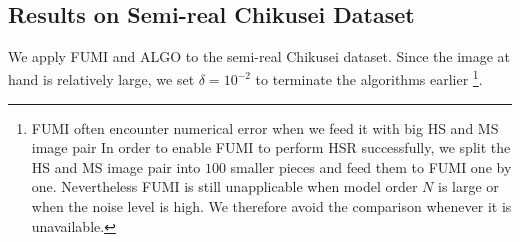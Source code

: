 \newpage
$\;$
\newpage
\subsection{Results on Semi-real Chikusei Dataset}
We apply FUMI and ALGO to the semi-real Chikusei dataset.
Since the image at hand is relatively large, we set $\delta = 10^{-2}$ to
terminate the algorithms earlier
\footnote{FUMI often encounter numerical error when we feed it with big
HS and MS image pair
In order to enable FUMI to perform HSR successfully, we split
the HS and MS image pair into $100$ smaller pieces and feed them to FUMI one
by one.
Nevertheless FUMI is still unapplicable when model order $N$ is large or when
the noise level is high.
We therefore avoid the comparison whenever it is unavailable.}.
\begin{table}[h]
\centering
{}
\end{table}
